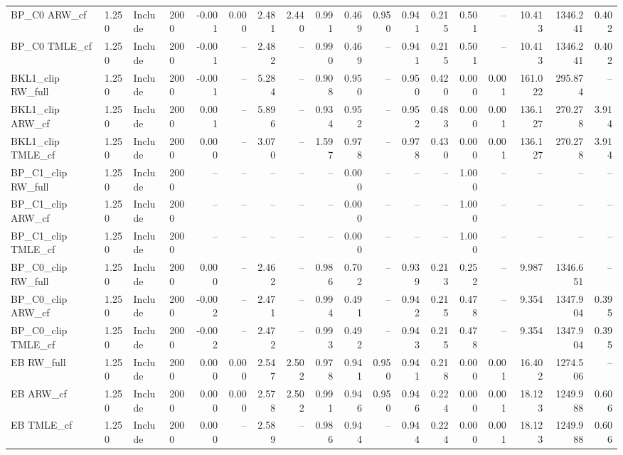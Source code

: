 \begin{tabular}{llllrrrrrrrrrrrrrr}
BP\_C0 ARW\_cf & 1.250 & Include & 2000 & -0.001 & 0.000 & 2.481 & 2.440 & 0.991 & 0.469 & 0.950 & 0.941 & 0.215 & 0.501 & -- & 10.413 & 1346.241 & 0.402 \\
BP\_C0 TMLE\_cf & 1.250 & Include & 2000 & -0.001 & -- & 2.482 & -- & 0.990 & 0.469 & -- & 0.941 & 0.215 & 0.501 & -- & 10.413 & 1346.241 & 0.402 \\
BKL1\_clip RW\_full & 1.250 & Include & 2000 & -0.001 & -- & 5.284 & -- & 0.908 & 0.950 & -- & 0.950 & 0.420 & 0.000 & 0.001 & 161.022 & 295.874 & -- \\
BKL1\_clip ARW\_cf & 1.250 & Include & 2000 & 0.001 & -- & 5.896 & -- & 0.934 & 0.952 & -- & 0.952 & 0.483 & 0.000 & 0.001 & 136.127 & 270.278 & 3.914 \\
BKL1\_clip TMLE\_cf & 1.250 & Include & 2000 & 0.000 & -- & 3.070 & -- & 1.597 & 0.978 & -- & 0.978 & 0.430 & 0.000 & 0.001 & 136.127 & 270.278 & 3.914 \\
BP\_C1\_clip RW\_full & 1.250 & Include & 2000 & -- & -- & -- & -- & -- & 0.000 & -- & -- & -- & 1.000 & -- & -- & -- & -- \\
BP\_C1\_clip ARW\_cf & 1.250 & Include & 2000 & -- & -- & -- & -- & -- & 0.000 & -- & -- & -- & 1.000 & -- & -- & -- & -- \\
BP\_C1\_clip TMLE\_cf & 1.250 & Include & 2000 & -- & -- & -- & -- & -- & 0.000 & -- & -- & -- & 1.000 & -- & -- & -- & -- \\
BP\_C0\_clip RW\_full & 1.250 & Include & 2000 & 0.000 & -- & 2.462 & -- & 0.986 & 0.702 & -- & 0.939 & 0.213 & 0.252 & -- & 9.987 & 1346.651 & -- \\
BP\_C0\_clip ARW\_cf & 1.250 & Include & 2000 & -0.002 & -- & 2.471 & -- & 0.994 & 0.491 & -- & 0.942 & 0.215 & 0.478 & -- & 9.354 & 1347.904 & 0.395 \\
BP\_C0\_clip TMLE\_cf & 1.250 & Include & 2000 & -0.002 & -- & 2.472 & -- & 0.993 & 0.492 & -- & 0.943 & 0.215 & 0.478 & -- & 9.354 & 1347.904 & 0.395 \\
EB RW\_full & 1.250 & Include & 2000 & 0.000 & 0.000 & 2.547 & 2.502 & 0.978 & 0.941 & 0.950 & 0.941 & 0.218 & 0.000 & 0.001 & 16.402 & 1274.506 & -- \\
EB ARW\_cf & 1.250 & Include & 2000 & 0.000 & 0.000 & 2.578 & 2.502 & 0.991 & 0.946 & 0.950 & 0.946 & 0.224 & 0.000 & 0.001 & 18.123 & 1249.988 & 0.606 \\
EB TMLE\_cf & 1.250 & Include & 2000 & 0.000 & -- & 2.589 & -- & 0.986 & 0.944 & -- & 0.944 & 0.224 & 0.000 & 0.001 & 18.123 & 1249.988 & 0.606 \\

\end{tabular}
